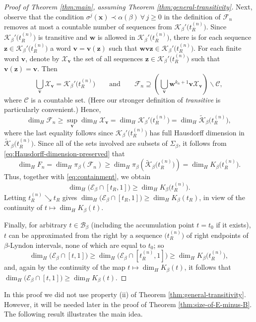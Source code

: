 \documentclass[11pt]{amsart}
\theoremstyle{definition}
\theoremstyle{remark}
\numberwithin{equation}{section}
\newcommand{\BB}{\mathscr{B}}
\newcommand{\EE}{\mathscr{E}}
\newcommand{\Kt}{\widetilde{\mathcal{K}}}
\renewcommand{\v}{\mathbf{v}}
\newcommand{\w}{\mathbf{w}}
\newcommand{\x}{\mathbf{x}}
\newcommand{\z}{\mathbf{z}}
\newcommand{\al}{\alpha}
\newcommand{\si}{\sigma}
\begin{document}
\begin{proof}[Proof of Theorem \ref{thm:main}, assuming Theorem \ref{thm:general-transitivity}]
Next, observe that the condition $\si^j(\x)\prec \al(\beta)\ \forall\,j\geq 0$ in the definition of $\mathcal{F}_n$ removes at most a countable number of sequences from $\mathcal{K}_\beta'\big(t_R^{(n)}\big)$.
Since $\mathcal{K}_\beta'\big(t_R^{(n)}\big)$ is transitive and $\w$ is allowed in $\mathcal{K}_\beta'\big(t_R^{(n)}\big)$, there is for each sequence $\z\in\mathcal{K}_\beta'\big(t_R^{(n)}\big)$ a word $\v=\v(\z)$ such that $\w\v\z\in \mathcal{K}_\beta'\big(t_R^{(n)}\big)$. For each finite word $\v$, denote by $\mathcal{X}_\v$ the set of all sequences $\z\in\mathcal{K}_\beta'\big(t_R^{(n)}\big)$ such that $\v(\z)=\v$. Then
\[
\bigcup_{\v} \mathcal{X}_\v=\mathcal{K}_\beta'\big(t_R^{(n)}\big) \qquad \mbox{and} \qquad \mathcal{F}_n\supseteq \left(\bigcup_\v\w^{k_n+1}\v\mathcal{X}_\v\right)\backslash\mathcal{C},
\]
where $\mathcal{C}$ is a countable set. (Here our stronger definition of {\em transitive} is particularly convenient.) Hence,
\[
\dim_H \mathcal{F}_n\geq \sup_\v \dim_H \mathcal{X}_\v=\dim_H \mathcal{K}_\beta'\big(t_R^{(n)}\big)=\dim_H \Kt_\beta\big(t_R^{(n)}\big),
\]
where the last equality follows since $\mathcal{K}_\beta'\big(t_R^{(n)}\big)$ has full Hausdorff dimension in $\Kt_\beta\big(t_R^{(n)}\big)$.
Since all of the sets involved are subsets of $\Sigma_\beta$, it follows from \eqref{eq:Hausdorff-dimension-preserved} that
\[
\dim_H F_n=\dim_H\pi_\beta(\mathcal{F}_n)\geq \dim_H \pi_\beta\left(\Kt_\beta\big(t_R^{(n)}\big)\right)=\dim_H K_\beta\big(t_R^{(n)}\big).
\]
Thus, together with \eqref{eq:containment}, we obtain
\[
\dim_H\big(\EE_\beta\cap[t_R,1]\big)\geq \dim_H K_\beta\big(t_R^{(n)}\big).
\]
Letting $t_R^{(n)}\searrow t_R$ gives $\dim_H\big(\EE_\beta\cap[t_R,1]\big)\geq \dim_H K_\beta(t_R)$, in view of the continuity of $t\mapsto \dim_H K_\beta(t)$.

Finally, for arbitrary $t\in\BB_\beta$ (including the accumulation point $t=t_0$ if it exists), $t$ can be approximated from the right by a sequence $\big(t_R^{(n)}\big)$ of right endpoints of $\beta$-Lyndon intervals, none of which are equal to $t_0$; so
\[
\dim_H\big(\EE_\beta\cap[t,1]\big)\geq \dim_H\big(\EE_\beta\cap[t_R^{(n)},1]\big)\geq \dim_H K_\beta\big(t_R^{(n)}\big),
\]
and, again by the continuity of the map $t\mapsto \dim_H K_\beta(t)$, it follows that $\dim_H\big(\EE_\beta\cap[t,1]\big)\geq \dim_H K_\beta(t)$.
\end{proof}

In this proof we did not use property (ii) of Theorem \ref{thm:general-transitivity}. However, it will be needed later in the proof of Theorem \ref{thm:size-of-E-minus-B}. The following result illustrates the main idea.
\end{document}
